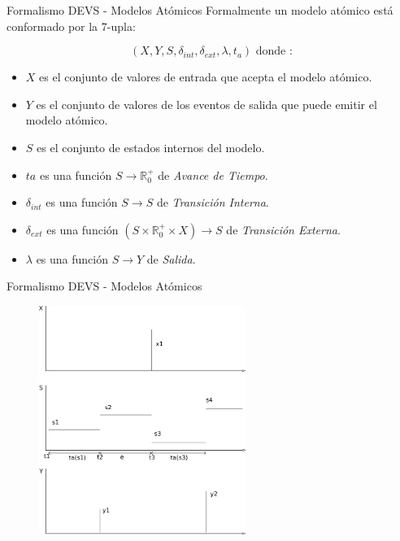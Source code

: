 \documentclass[10pt,presentation]{beamer}
\begin{document}
\begin{frame}{Formalismo DEVS - Modelos Atómicos}
	Formalmente un modelo atómico está conformado por la 7-upla:

	\begin{equation*} 
	(X, Y, S, \delta_{int} , \delta_{ext}, \lambda, t_{a}) \mbox{ donde :}
	\end{equation*}

	\begin{itemize}
	\item<1-> $X$ es el conjunto de valores de entrada que acepta el modelo atómico.
	\item<2-> $Y$ es el conjunto de valores de los eventos de salida que puede emitir el modelo atómico.
	\item<3-> $S$ es el conjunto de estados internos del modelo.
	\item<4-> $ta$ es una función $S \to \mathbb{R}^{+}_{0}$ de \emph{Avance de Tiempo}.
	\item<5-> $\delta_{int}$ es una función $S \to S$ de \emph{Transición Interna}.
	\item<6-> $\delta_{ext}$ es una función $(S \times \mathbb{R}^{+}_{0} \times X) \to S$ de \emph{Transición Externa}.
	\item<7-> $\lambda$ es una función $S \to Y$ de \emph{Salida}.
	\end{itemize}
\end{frame}

\begin{frame}{Formalismo DEVS - Modelos Atómicos}
	\begin{figure}[H]
	  \includegraphics[width=0.6\textwidth]{devs-atomic}
	\end{figure}
\end{frame}
\end{document}
